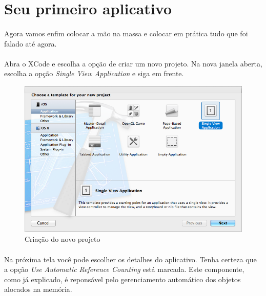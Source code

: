 \documentclass[a4paper,12pt,brazil,doubleside]{book}
\begin{document}
\bigskip
\bigskip


\section{Seu primeiro aplicativo}

\paragraph{}Agora vamos enfim colocar a mão na massa e colocar em prática tudo que foi falado até agora.
\paragraph{}Abra o XCode e escolha a opção de criar um novo projeto. Na nova janela aberta, escolha a opção \emph{Single View Application} e siga em frente.

\begin{figure}[h]
  \centering
  \includegraphics[totalheight=0.4\textheight]{figuras/1/novo_projeto1.png}
  \caption{Criação do novo projeto}
  \label{fig:a}
\end{figure}

\paragraph{}Na próxima tela você pode escolher os detalhes do aplicativo. Tenha certeza que a opção \emph{Use Automatic Reference Counting} está marcada. Este componente, como já explicado, é reponsável pelo gerenciamento automático dos objetos alocados na memória.

\pagebreak
\end{document}
